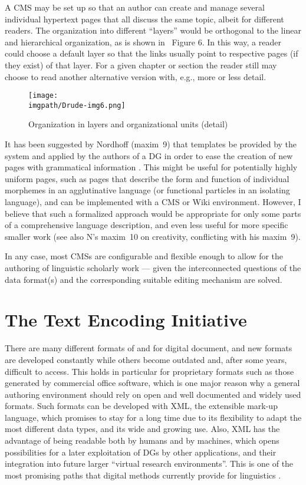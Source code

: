 A CMS may be set up so that an author can create and manage several individual hypertext pages that all discuss the same topic, albeit for different readers. The organization into different ``layers'' would be orthogonal to the linear and hierarchical organization, as is shown in~ Figure 6. In this way, a reader could choose a default layer so that the links usually point to respective pages (if they exist) of that layer. For a given chapter or section the reader still may choose to read another alternative version with, e.g., more or less detail.


\begin{figure}
\texttt{[image: \\imgpath/Drude-img6.png]}
\caption{Organization in layers and organizational units (detail)}
\label{bkm:Ref299295833}
\end{figure}

It has been suggested by Nordhoff (maxim~9) that templates be provided by the system and applied by the authors of a DG in order to ease the creation of new pages with grammatical information \citep{Blacktv}. This might be useful for potentially highly uniform pages, such as pages that describe the form and function of individual morphemes in an agglutinative language (or functional particles in an isolating language), and can be implemented with a CMS or Wiki environment. However, I believe that such a formalized approach would be appropriate for only some parts of a comprehensive language description, and even less useful for more specific smaller work (see also N's maxim~10 on creativity, conflicting with his maxim~9).

In any case, most CMSs are configurable and flexible enough to allow for the authoring of linguistic scholarly work --- given the interconnected questions of the data format(s) and the corresponding suitable editing mechanism are solved.

\section{The Text Encoding Initiative} 
There are many different formats of and for digital document, and new formats are developed constantly while others become outdated and, after some years, difficult to access. This holds in particular for proprietary formats such as those generated by commercial office software, which is one major reason why a general authoring environment should rely on open and well documented and widely used formats. Such formats can be developed with XML, the extensible mark-up language, which promises to stay for a long time due to its flexibility to adapt the most different data types, and its wide and growing use.  Also, XML has the advantage of being readable both by humans and by machines, which opens possibilities for a later exploitation of DGs by other applications, and their integration into future larger ``virtual research environments''. This is one of the most promising paths that digital methods currently provide for linguistics \citep{BenderEtAl2010lingo}.

